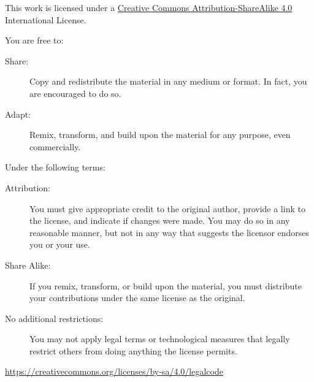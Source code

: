 \documentclass[a4paper]{article}
\begin{document}

\renewcommand{\thepage}{\roman{page}}
\setcounter{page}{0}

\begin{titlepage}
\titleDB
\end{titlepage}



\begin{center}
This work is licensed under a
\href{http://creativecommons.org/licenses/by-sa/4.0/}{Creative Commons Attribution-ShareAlike 4.0}
\\ International License.
\end{center}


\begin{center}
You are free to:
\end{center}

\begin{description}
  \item[Share:] Copy and redistribute the material in any medium or format. In fact, you are encouraged to do so.
  \item[Adapt:] Remix, transform, and build upon the material
for any purpose, even commercially.
\end{description}

\begin{center}
Under the following terms:
\end{center}

\begin{description}
\item[Attribution:] You must give appropriate credit to the original author, provide a link to the license, and indicate if changes were made. You may do so in any reasonable manner, but not in any way that suggests the licensor endorses you or your use.

\item[Share Alike:] If you remix, transform, or build upon the material, you must distribute your contributions under the same license as the original.
\item[No additional restrictions:] You may not apply legal terms or technological measures that legally restrict others from doing anything the license permits.
\end{description}

\begin{center}
\url{https://creativecommons.org/licenses/by-sa/4.0/legalcode}
\end{center}
\end{document}
